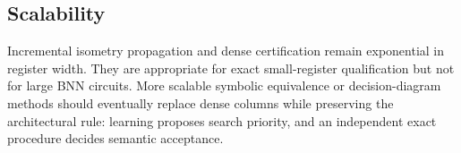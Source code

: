\subsection{Scalability}

Incremental isometry propagation and dense certification remain exponential in register width. They are appropriate for exact small-register qualification but not for large BNN circuits. More scalable symbolic equivalence or decision-diagram methods should eventually replace dense columns while preserving the architectural rule: learning proposes search priority, and an independent exact procedure decides semantic acceptance.
